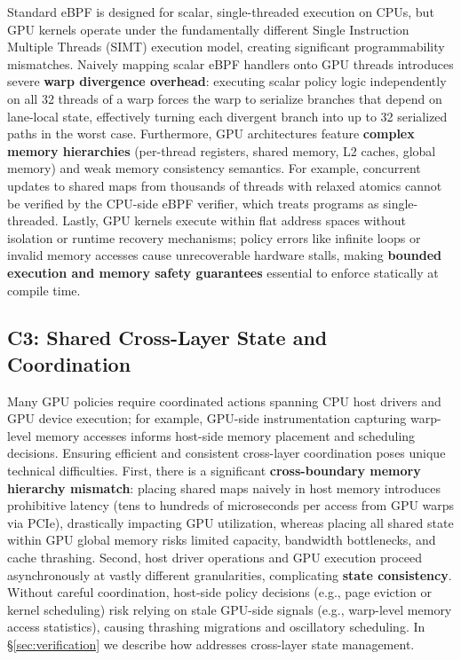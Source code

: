 Standard eBPF is designed for scalar, single-threaded execution on CPUs, but GPU kernels operate under the fundamentally different Single Instruction Multiple Threads (SIMT) execution model, creating significant programmability mismatches. Naively mapping scalar eBPF handlers onto GPU threads introduces severe \textbf{warp divergence overhead}: executing scalar policy logic independently on all 32 threads of a warp forces the warp to serialize branches that depend on lane-local state, effectively turning each divergent branch into up to 32 serialized paths in the worst case. Furthermore, GPU architectures feature \textbf{complex memory hierarchies} (per-thread registers, shared memory, L2 caches, global memory) and weak memory consistency semantics. For example, concurrent updates to shared maps from thousands of threads with relaxed atomics cannot be verified by the CPU-side eBPF verifier, which treats programs as single-threaded. Lastly, GPU kernels execute within flat address spaces without isolation or runtime recovery mechanisms; policy errors like infinite loops or invalid memory accesses cause unrecoverable hardware stalls, making \textbf{bounded execution and memory safety guarantees} essential to enforce statically at compile time.

\subsection{C3: Shared Cross-Layer State and Coordination}

Many GPU policies require coordinated actions spanning CPU host drivers and GPU device execution; for example, GPU-side instrumentation capturing warp-level memory accesses informs host-side memory placement and scheduling decisions. Ensuring efficient and consistent cross-layer coordination poses unique technical difficulties. First, there is a significant \textbf{cross-boundary memory hierarchy mismatch}: placing shared maps naively in host memory introduces prohibitive latency (tens to hundreds of microseconds per access from GPU warps via PCIe), drastically impacting GPU utilization, whereas placing all shared state within GPU global memory risks limited capacity, bandwidth bottlenecks, and cache thrashing. Second, host driver operations and GPU execution proceed asynchronously at vastly different granularities, complicating \textbf{state consistency}. Without careful coordination, host-side policy decisions (e.g., page eviction or kernel scheduling) risk relying on stale GPU-side signals (e.g., warp-level memory access statistics), causing thrashing migrations and oscillatory scheduling. In \S\ref{sec:verification} we describe how \sys addresses cross-layer state management.

